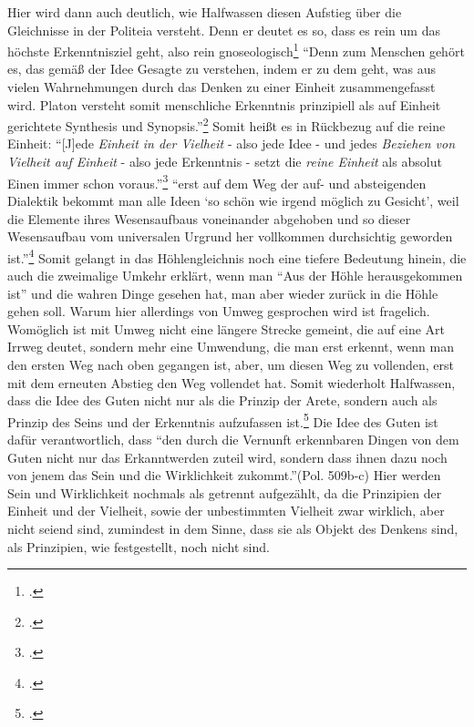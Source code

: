 Hier wird dann auch deutlich, wie Halfwassen diesen Aufstieg über die Gleichnisse in der Politeia versteht. Denn er deutet es so, dass es rein um das höchste Erkenntnisziel geht, also rein gnoseologisch\footcite[vgl.][S. 226]{halfwassenaufstieg2006}
\enquote{Denn zum Menschen gehört es, das gemäß der Idee Gesagte zu verstehen, indem er zu dem geht, was aus vielen Wahrnehmungen durch das Denken zu einer Einheit zusammengefasst wird. Platon versteht somit menschliche Erkenntnis prinzipiell als auf Einheit gerichtete Synthesis und Synopsis.}\footcite[][S. 228]{halfwassenaufstieg2006}
Somit heißt es in Rückbezug auf die reine Einheit:
\enquote{[J]ede \emph{Einheit in der Vielheit} - also jede Idee - und jedes \emph{Beziehen von Vielheit auf Einheit} - also jede Erkenntnis - setzt die \emph{reine Einheit} als absolut Einen immer schon voraus.}\footcite[][S. 230]{halfwassenaufstieg2006}
\enquote{erst auf dem Weg der auf- und absteigenden Dialektik bekommt man alle Ideen \enquote{so schön wie irgend möglich zu Gesicht}, weil die Elemente ihres Wesensaufbaus voneinander abgehoben und so dieser Wesensaufbau vom universalen Urgrund her vollkommen durchsichtig geworden ist.}\footcite[][S. 231]{halfwassenaufstieg2006}
Somit gelangt in das Höhlengleichnis noch eine tiefere Bedeutung hinein, die auch die zweimalige Umkehr erklärt, wenn man \enquote{Aus der Höhle herausgekommen ist} und die wahren Dinge gesehen hat, man aber wieder zurück in die Höhle gehen soll. Warum hier allerdings von Umweg gesprochen wird ist fragelich. Womöglich ist mit Umweg nicht eine längere Strecke gemeint, die auf eine Art Irrweg deutet, sondern mehr eine Umwendung, die man erst erkennt, wenn man den ersten Weg nach oben gegangen ist, aber, um diesen Weg zu vollenden, erst mit dem erneuten Abstieg den Weg vollendet hat. 
Somit wiederholt Halfwassen, dass die Idee des Guten nicht nur als die Prinzip der Arete, sondern auch als Prinzip des Seins und der Erkenntnis aufzufassen ist.\footcite[vgl.][S. 238]{halfwassenaufstieg2006}
Die Idee des Guten ist dafür verantwortlich, dass \enquote{den durch die Vernunft erkennbaren Dingen von dem Guten nicht nur das Erkanntwerden zuteil wird, sondern dass ihnen dazu noch von jenem das Sein und die Wirklichkeit zukommt.}(Pol. 509b-c) 
Hier werden Sein und Wirklichkeit nochmals als getrennt aufgezählt, da die Prinzipien der Einheit und der Vielheit, sowie der unbestimmten Vielheit zwar wirklich, aber nicht seiend sind, zumindest in dem Sinne, dass sie als Objekt des Denkens sind, als Prinzipien, wie festgestellt, noch nicht sind.
